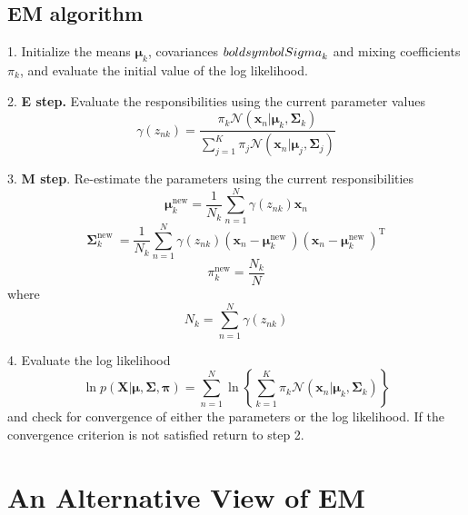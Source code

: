 \documentclass[5p,sort&compress]{elsarticle}
\begin{document}
\subsection{EM algorithm}

1. Initialize the means $\boldsymbol{\mu}_k$, covariances $\\boldsymbol{Sigma}_k$ and mixing coefficients $\pi_k$, and evaluate the initial value of the log likelihood.

2. \textbf{E step.} Evaluate the responsibilities using the current parameter values
\begin{equation}
\gamma\left(z_{n k}\right)=\frac{\pi_{k} \mathcal{N}\left(\mathbf{x}_{n} | \boldsymbol{\mu}_{k}, \mathbf{\Sigma}_{k}\right)}{\sum_{j=1}^{K} \pi_{j} \mathcal{N}\left(\mathbf{x}_{n} | \boldsymbol{\mu}_{j}, \mathbf{\Sigma}_{j}\right)}
\end{equation}

3. \textbf{M step}. Re-estimate the parameters using the current responsibilities
\begin{equation}
\boldsymbol{\mu}_{k}^{\mathrm{new}}=\frac{1}{N_{k}} \sum_{n=1}^{N} \gamma\left(z_{n k}\right) \mathbf{x}_{n}
\end{equation}
\begin{equation}
\boldsymbol{\Sigma}_{k}^{\text {new }}=\frac{1}{N_{k}} \sum_{n=1}^{N} \gamma\left(z_{n k}\right)\left(\mathbf{x}_{n}-\boldsymbol{\mu}_{k}^{\text {new }}\right)\left(\mathbf{x}_{n}-\boldsymbol{\mu}_{k}^{\text {new }}\right)^{\mathrm{T}}
\end{equation}
\begin{equation}
\pi_{k}^{\mathrm{new}}=\frac{N_{k}}{N}
\end{equation}
where
\begin{equation}
N_{k}=\sum_{n=1}^{N} \gamma\left(z_{n k}\right)
\end{equation}

4. Evaluate the log likelihood
\begin{equation}
\ln p(\mathbf{X} | \boldsymbol{\mu}, \mathbf{\Sigma}, \boldsymbol{\pi})=\sum_{n=1}^{N} \ln \left\{\sum_{k=1}^{K} \pi_{k} \mathcal{N}\left(\mathbf{x}_{n} | \boldsymbol{\mu}_{k}, \mathbf{\Sigma}_{k}\right)\right\}
\end{equation}
and check for convergence of either the parameters or the log likelihood. If the convergence criterion is not satisfied return to step 2.


\section{An Alternative View of EM}
\end{document}
